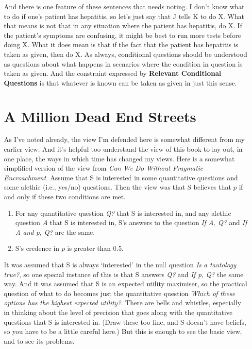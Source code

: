 \documentclass[11pt,]{book}
\providecommand{\tightlist}{%
  \setlength{\itemsep}{0pt}\setlength{\parskip}{0pt}}
\begin{document}
And there is one feature of these sentences that needs noting. I don't know what to do if one's patient has hepatitis, so let's just say that J tells K to do X. What that means is not that in any situation where the patient has hepatitis, do X. If the patient's symptoms are confusing, it might be best to run more tests before doing X. What it does mean is that if the fact that the patient has hepatitis is taken as given, then do X. As always, conditional questions should be understood as questions about what happens in scenarios where the condition in question is taken as given. And the constraint expressed by \textbf{Relevant Conditional Questions} is that whatever is known can be taken as given in just this sense.

\hypertarget{changes}{%
\section{A Million Dead End Streets}\label{changes}}

As I've noted already, the view I'm defended here is somewhat different from my earlier view. And it's helpful too understand the view of this book to lay out, in one place, the ways in which time has changed my views. Here is a somewhat simplified version of the view from \emph{Can We Do Without Pragmatic Encroachment}. Assume that S is interested in some quantitative questions and some alethic (i.e., yes/no) questions. Then the view was that S believes that \(p\) if and only if these two conditions are met.

\begin{enumerate}
\def\labelenumi{\arabic{enumi}.}
\tightlist
\item
  For any quantitative question \emph{Q?} that S is interested in, and any alethic question \emph{A} that S is interested in, S's answers to the question \emph{If A, Q?} and \emph{If A and p, Q?} are the same.
\item
  S's credence in \(p\) is greater than 0.5.
\end{enumerate}

It was assumed that S is always `interested' in the null question \emph{Is a tautology true?}, so one special instance of this is that S answers \emph{Q?} and \emph{If p, Q?} the same way. And it was assumed that S is an expected utility maximiser, so the practical question of what to do becomes just the quantitative question \emph{Which of these options has the highest expected utility?}. There are bells and whistles, especially in thinking about the level of precision that goes along with the quantitative questions that S is interested in. (Draw these too fine, and S doesn't have beliefs, so you have to be a little careful here.) But this is enough to see the basic view, and to see its problems.
\end{document}
